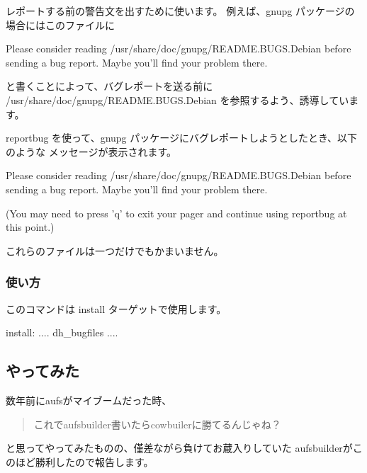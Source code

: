 \documentclass[mingoth,a4paper]{jsarticle}
\begin{document}
\begin{itemize}
レポートする前の警告文を出すために使います。
例えば、gnupg パッケージの場合にはこのファイルに
\begin{commandline}
Please consider reading /usr/share/doc/gnupg/README.BUGS.Debian before
sending a bug report. Maybe you'll find your problem there.
\end{commandline}
と書くことによって、バグレポートを送る前に /usr/share/doc/gnupg/README.BUGS.Debian
を参照するよう、誘導しています。

reportbug を使って、gnupg パッケージにバグレポートしようとしたとき、以下のような
メッセージが表示されます。
\begin{commandline}
Please consider reading /usr/share/doc/gnupg/README.BUGS.Debian before
sending a bug report. Maybe you'll find your problem there.


(You may need to press 'q' to exit your pager and continue using
reportbug at this point.)
\end{commandline}

\end{itemize}

これらのファイルは一つだけでもかまいません。

\subsubsection{使い方}

このコマンドは install ターゲットで使用します。

\begin{commandline}
install:
    ....
    dh_bugfiles
    ....
\end{commandline}



\subsection{やってみた}
数年前にaufsがマイブームだった時、
\begin{quote}
\Large{これでaufsbuilder書いたらcowbuilerに勝てるんじゃね？}
\end{quote}
と思ってやってみたものの、僅差ながら負けてお蔵入りしていた
aufsbuilderがこのほど勝利したので報告します。
\end{document}
